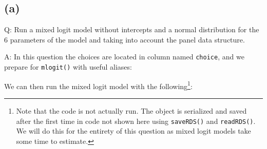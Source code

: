 \documentclass[
]{article}
\newenvironment{Shaded}{\begin{snugshade}}{\end{snugshade}}
\newcommand{\CommentTok}[1]{\textcolor[rgb]{0.56,0.35,0.01}{\textit{#1}}}
\newcommand{\DecValTok}[1]{\textcolor[rgb]{0.00,0.00,0.81}{#1}}
\newcommand{\KeywordTok}[1]{\textcolor[rgb]{0.13,0.29,0.53}{\textbf{#1}}}
\newcommand{\NormalTok}[1]{#1}
\newcommand{\OperatorTok}[1]{\textcolor[rgb]{0.81,0.36,0.00}{\textbf{#1}}}
\newcommand{\StringTok}[1]{\textcolor[rgb]{0.31,0.60,0.02}{#1}}
\begin{document}
\hypertarget{twoa}{%
\subsection{(a)}\label{twoa}}

Q: Run a mixed logit model without intercepts and a normal distribution
for the 6 parameters of the model and taking into account the panel data
structure.

A: In this question the choices are located in column named
\texttt{choice}, and we prepare for \texttt{mlogit()} with useful
aliases:

\begin{Shaded}
\end{Shaded}

We can then run the mixed logit model with the following\footnote{Note
  that the code is not actually run. The object is serialized and saved
  after the first time in code not shown here using \texttt{saveRDS()}
  and \texttt{readRDS()}. We will do this for the entirety of this
  question as mixed logit models take some time to estimate.}:
\end{document}
